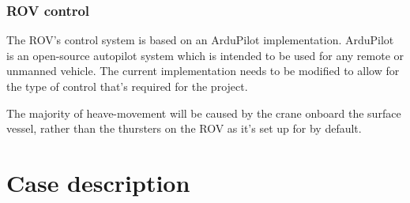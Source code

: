 \documentclass[class=article, crop=false]{standalone}
\begin{document}
\subsubsection{ROV control}
The ROV's control system is based on an ArduPilot implementation. ArduPilot is an open-source autopilot system which is intended to be used for any remote or unmanned vehicle. The current implementation needs to be modified to allow for the type of control that's required for the project.

The majority of heave-movement will be caused by the crane onboard the surface vessel, rather than the thursters on the ROV as it's set up for by default.
\section{Case description}
\end{document}

